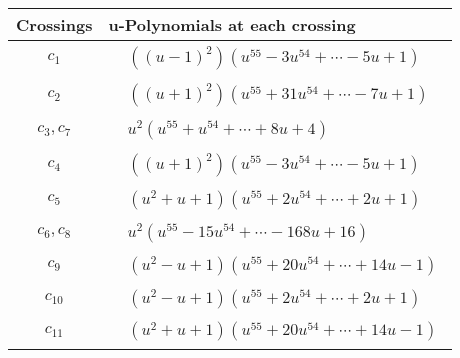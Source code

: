 \documentclass[1p]{elsarticle_modified}
\theoremstyle{definition}
\begin{document}
\begin{tabular}{m{50pt}|m{274pt}}
Crossings & \hspace{64pt}u-Polynomials at each crossing \\
\hline $$\begin{aligned}c_{1}\end{aligned}$$&$\begin{aligned}
&((u-1)^2)(u^{55}-3 u^{54}+\cdots-5 u+1)
\end{aligned}$\\
\hline $$\begin{aligned}c_{2}\end{aligned}$$&$\begin{aligned}
&((u+1)^2)(u^{55}+31 u^{54}+\cdots-7 u+1)
\end{aligned}$\\
\hline $$\begin{aligned}c_{3},c_{7}\end{aligned}$$&$\begin{aligned}
&u^2(u^{55}+u^{54}+\cdots+8 u+4)
\end{aligned}$\\
\hline $$\begin{aligned}c_{4}\end{aligned}$$&$\begin{aligned}
&((u+1)^2)(u^{55}-3 u^{54}+\cdots-5 u+1)
\end{aligned}$\\
\hline $$\begin{aligned}c_{5}\end{aligned}$$&$\begin{aligned}
&(u^2+u+1)(u^{55}+2 u^{54}+\cdots+2 u+1)
\end{aligned}$\\
\hline $$\begin{aligned}c_{6},c_{8}\end{aligned}$$&$\begin{aligned}
&u^2(u^{55}-15 u^{54}+\cdots-168 u+16)
\end{aligned}$\\
\hline $$\begin{aligned}c_{9}\end{aligned}$$&$\begin{aligned}
&(u^2- u+1)(u^{55}+20 u^{54}+\cdots+14 u-1)
\end{aligned}$\\
\hline $$\begin{aligned}c_{10}\end{aligned}$$&$\begin{aligned}
&(u^2- u+1)(u^{55}+2 u^{54}+\cdots+2 u+1)
\end{aligned}$\\
\hline $$\begin{aligned}c_{11}\end{aligned}$$&$\begin{aligned}
&(u^2+u+1)(u^{55}+20 u^{54}+\cdots+14 u-1)
\end{aligned}$\\
\hline
\end{tabular}\newpage\renewcommand{\arraystretch}{1}
\end{document}
